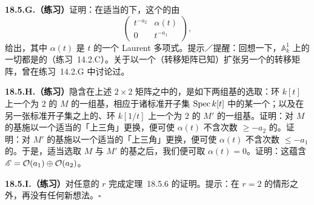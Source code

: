 \textbf{18.5.G.（练习）}\quad 证明：在适当的\trCoordinate{}下，这个\trVectorBundle{}的\trTransitionFunction{}由
\[
\begin{pmatrix} t^{-a_2} & \alpha(t) \\ 0 & t^{-a_1} \end{pmatrix},
\]
给出，其中 $\alpha(t)$ 是 $t$ 的一个 Laurent 多项式。提示／提醒：回想一下，$\mathbb{A}^1_k$ 上的一切\trVectorBundle{}都是\trTrivial{}的（\mbox{练习~14.2.C}）。关于以一个\trVectorBundle{}（转移矩阵已知）扩张另一个\trVectorBundle{}的转移矩阵，曾在\mbox{练习~14.2.G} 中讨论过。

\textbf{18.5.H.（练习）}\quad 隐含在上述 $2\times 2$ 矩阵之中的，是如下两组基的选取：环 $k[t]$ 上一个\trRank{}为 $2$ 的\trFreeModule{} $M$ 的一组基，相应于诸标准\trAffine{}开子集 $\operatorname{Spec} k[t]$ 中的某一个；以及在另一张标准开子集之上的、环 $k[1/t]$ 上一个\trRank{}为 $2$ 的\trFreeModule{} $M'$ 的一组基。证明：对 $M$ 的基施以一个适当的「上三角」更换，便可使 $\alpha(t)$ 不含次数 $\ge -a_2$ 的\trMonomial。证明：对 $M'$ 的基施以一个适当的「上三角」更换，便可使 $\alpha(t)$ 不含次数 $\le -a_1$ 的\trMonomial。于是，适当选取 $M$ 与 $M'$ 的基之后，我们便可取 $\alpha(t)=0$。证明：这蕴含 $\mathscr{E}=\mathcal{O}(a_1)\oplus\mathcal{O}(a_2)$。

\textbf{18.5.I.（练习）}\quad 对任意的 $r$ 完成\mbox{定理~18.5.6} 的证明。提示：在 $r=2$ 的情形之外，再没有任何新想法。\hfill$\square$
